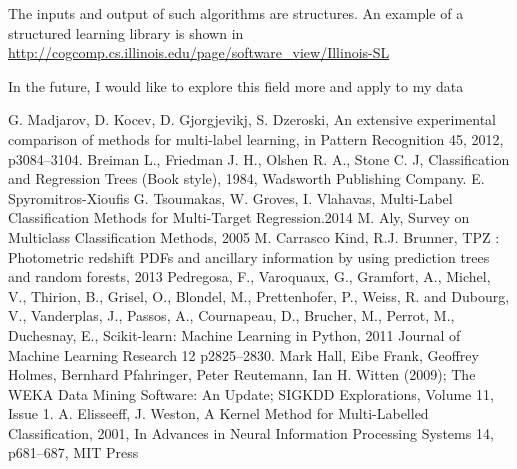 \documentclass[letterpaper, 11 pt, conference]{IEEEtran}  %
\begin{document}
The inputs and output of such algorithms are structures. An example of a structured learning library is shown in  \url{http://cogcomp.cs.illinois.edu/page/software\_view/Illinois-SL}

In the future, I would like to explore this field more and apply to my data

\addtolength{\textheight}{-12cm}   %









\begin{thebibliography}{99}

 G. Madjarov, D. Kocev, D. Gjorgjevikj, S. Dzeroski, An extensive experimental comparison of methods for multi-label learning, in Pattern Recognition 45, 2012, p3084–3104.
 Breiman L., Friedman J. H., Olshen R. A., Stone
C. J, Classification and Regression Trees (Book style), 1984, Wadsworth Publishing Company.
 E. Spyromitros-Xioufis G. Tsoumakas, W. Groves, I. Vlahavas, Multi-Label Classification Methods for Multi-Target Regression.2014
 M. Aly, Survey on Multiclass Classification Methods, 2005
 M. Carrasco Kind, R.J. Brunner, TPZ : Photometric redshift PDFs and ancillary
information by using prediction trees and random forests, 2013
 Pedregosa, F., Varoquaux, G., Gramfort, A., Michel, V., Thirion, B., Grisel, O., Blondel, M., Prettenhofer, P., Weiss, R. and Dubourg, V., Vanderplas, J., Passos, A., Cournapeau, D., Brucher, M., Perrot, M., Duchesnay, E., Scikit-learn: Machine Learning in {P}ython, 2011 Journal of Machine Learning Research 12 p2825--2830.
 Mark Hall, Eibe Frank, Geoffrey Holmes, Bernhard Pfahringer, Peter Reutemann, Ian H. Witten (2009); The WEKA Data Mining Software: An Update; SIGKDD Explorations, Volume 11, Issue 1.
 A. Elisseeff, J. Weston, A Kernel Method for Multi-Labelled Classification, 2001, In Advances in Neural Information Processing Systems 14, p681--687, MIT Press

\end{thebibliography}
\end{document}
